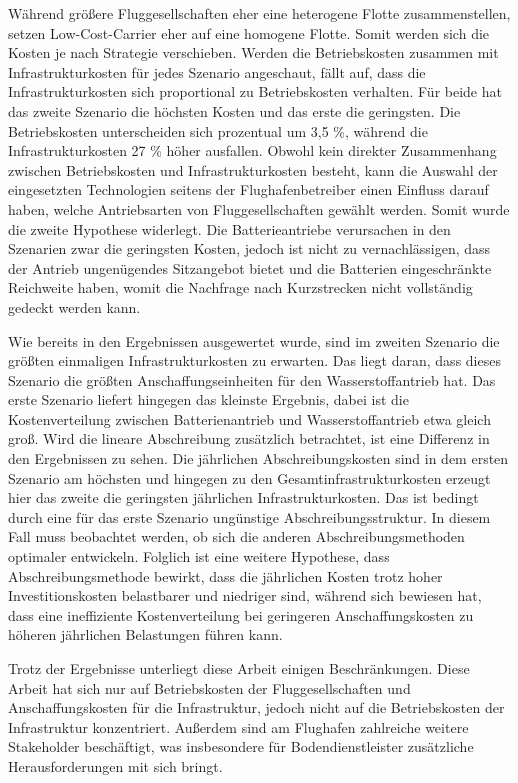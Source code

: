 Während größere Fluggesellschaften eher eine heterogene Flotte zusammenstellen, 
setzen Low-Cost-Carrier eher auf eine homogene Flotte.
Somit werden sich die Kosten je nach Strategie verschieben.
Werden die Betriebskosten zusammen mit Infrastrukturkosten für jedes Szenario angeschaut, fällt auf, 
dass die Infrastrukturkosten sich proportional zu Betriebskosten verhalten. 
Für beide hat das zweite Szenario die höchsten Kosten und das erste die geringsten. 
Die Betriebskosten unterscheiden sich prozentual um 3,5 \%, 
während die Infrastrukturkosten 27 \% höher ausfallen.
Obwohl kein direkter Zusammenhang zwischen Betriebskosten und Infrastrukturkosten besteht, 
kann die Auswahl der eingesetzten Technologien seitens der Flughafenbetreiber einen Einfluss darauf haben, 
welche Antriebsarten von Fluggesellschaften gewählt werden. Somit wurde die zweite Hypothese widerlegt.
Die Batterieantriebe verursachen in den Szenarien zwar die geringsten Kosten,
jedoch ist nicht zu vernachlässigen, dass der Antrieb ungenügendes Sitzangebot bietet
und die Batterien eingeschränkte Reichweite haben, 
womit die Nachfrage nach Kurzstrecken nicht vollständig gedeckt werden kann.


Wie bereits in den Ergebnissen ausgewertet wurde, sind im zweiten Szenario die größten einmaligen Infrastrukturkosten zu erwarten.
Das liegt daran, dass dieses Szenario die größten Anschaffungseinheiten für den Wasserstoffantrieb hat. 
Das erste Szenario liefert hingegen das kleinste Ergebnis, dabei ist die Kostenverteilung zwischen Batterienantrieb 
und Wasserstoffantrieb etwa gleich groß.
Wird die lineare Abschreibung zusätzlich betrachtet, ist eine Differenz in den Ergebnissen zu sehen. 
Die jährlichen Abschreibungskosten sind in dem ersten Szenario am höchsten 
und hingegen zu den Gesamtinfrastrukturkosten erzeugt hier das zweite die geringsten jährlichen Infrastrukturkosten.
Das ist bedingt durch eine für das erste Szenario ungünstige Abschreibungsstruktur. 
In diesem Fall muss beobachtet werden, ob sich die anderen Abschreibungsmethoden optimaler entwickeln.
Folglich ist eine weitere Hypothese, dass Abschreibungsmethode bewirkt, 
dass die jährlichen Kosten trotz hoher Investitionskosten belastbarer und niedriger sind, 
während sich bewiesen hat, dass eine ineffiziente Kostenverteilung bei geringeren Anschaffungskosten zu 
höheren jährlichen Belastungen führen kann.

%
Trotz der Ergebnisse unterliegt diese Arbeit einigen Beschränkungen. %
Diese Arbeit hat sich nur auf Betriebskosten der Fluggesellschaften und Anschaffungskosten für die Infrastruktur,
jedoch nicht auf die Betriebskosten der Infrastruktur konzentriert. 
Außerdem sind am Flughafen zahlreiche weitere Stakeholder beschäftigt, 
was insbesondere für Bodendienstleister zusätzliche Herausforderungen mit sich bringt.

